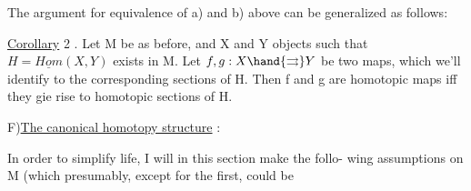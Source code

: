 The argument for equivalence of a) and b) above can be generalized
as follows:

\uline{Corollary} 2 . Let M be as before, and X and Y objects such that
$H = \underline{Hom}(X,Y)$ exists in M. Let $f,g: X \hand{\rightrightarrows} Y$ be two maps, which we'll
identify to the corresponding sections of H. Then f and g are homotopic
maps iff they gie rise to homotopic sections of H.

F)\quad \uline{The canonical homotopy structure} : 

In order to simplify life, I will in this section make the follo-%
wing assumptions on M (which presumably, except for the first, could be


